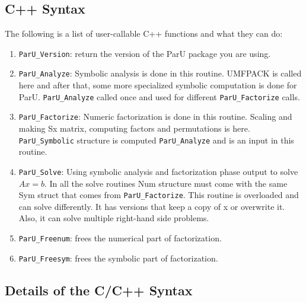 \documentclass[12pt]{article}
\begin{document}
\subsection{C++ Syntax}

The following is a list of user-callable C++ functions and what they
can do:

\begin{enumerate}

    \item \verb'ParU_Version': return the version of the ParU package 
        you are using.

    \item \verb'ParU_Analyze': Symbolic analysis is done in this routine. 
        UMFPACK is called here and after that, some more specialized symbolic
        computation is done for ParU. 
        \verb'ParU_Analyze' called once and used for different 
        \verb'ParU_Factorize'
        calls.
    \item \verb'ParU_Factorize': 
        Numeric factorization is done in this routine. Scaling and
        making Sx matrix, computing factors and permutations is here. 
        \verb'ParU_Symbolic' structure is computed \verb'ParU_Analyze' 
        and is an input in this routine.

    \item \verb'ParU_Solve':  
        Using symbolic analysis and factorization phase output to solve $Ax=b$.
        In all the solve routines Num structure must come with the same 
        Sym struct that comes from \verb'ParU_Factorize'. 
        This routine is overloaded and can solve differently. It has versions 
        that keep a copy of x or overwrite it. Also, it can solve multiple 
        right-hand side problems.

    \item \verb'ParU_Freenum':  frees the numerical part of factorization.


    \item \verb'ParU_Freesym':  frees the symbolic part of factorization.

\end{enumerate}

\subsection{Details of the C/C++ Syntax}
\end{document}
